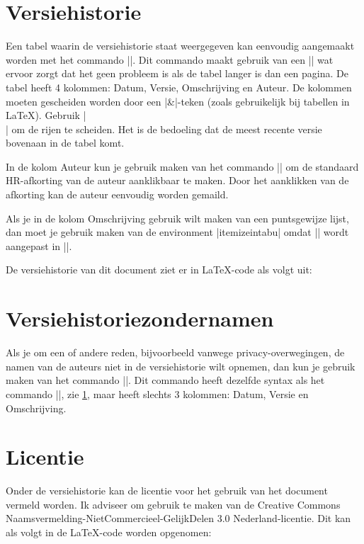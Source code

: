 \section{Versiehistorie}
\label{sec:versiehistorie}
Een tabel waarin de versiehistorie staat weergegeven kan eenvoudig aangemaakt worden met het commando |\versiehistorie|.
Dit commando maakt gebruik van een |\longtabu| wat ervoor zorgt dat het geen probleem is als de tabel langer is dan een pagina.
De tabel heeft 4 kolommen: Datum, Versie, Omschrijving en Auteur.
De kolommen moeten gescheiden worden door een |&|-teken (zoals gebruikelijk bij tabellen in \LaTeX{}).
Gebruik |\\ \line| om de rijen te scheiden.
Het is de bedoeling dat de meest recente versie bovenaan in de tabel komt.

In de kolom Auteur kun je gebruik maken van het commando |\mailafko| om de standaard HR-afkorting van de auteur aanklikbaar te maken.
Door het aanklikken van de afkorting kan de auteur eenvoudig worden gemaild.

Als je in de kolom Omschrijving gebruik wilt maken van een puntsgewijze lijst,
dan moet je gebruik maken van de environment |itemizeintabu| omdat |\baslineskip| wordt aangepast in |\tabu|.

De versiehistorie van dit document ziet er in \LaTeX{}-code als volgt uit:

\section{Versiehistoriezondernamen}
\label{sec:versiehistoriezondernamen}
Als je om een of andere reden, bijvoorbeeld vanwege privacy-overwegingen, de namen van de auteurs niet in de versiehistorie wilt opnemen, dan kun je gebruik maken van het commando |\versiehistoriezondernamen|.
Dit commando heeft dezelfde syntax als het commando |\versiehistorie|, zie \cref{sec:versiehistorie}, maar heeft slechts 3 kolommen: Datum, Versie en Omschrijving.

\section{Licentie}
Onder de versiehistorie kan de licentie voor het gebruik van het document vermeld worden.
Ik adviseer om gebruik te maken van de Creative Commons Naams\-ver\-mel\-ding\hyp{}Niet\-Com\-mer\-cieel\hyp{}Ge\-lijk\-De\-len 3.0 Nederland\hyp{}licentie.
Dit kan als volgt in de \LaTeX{}-code worden opgenomen:
 
